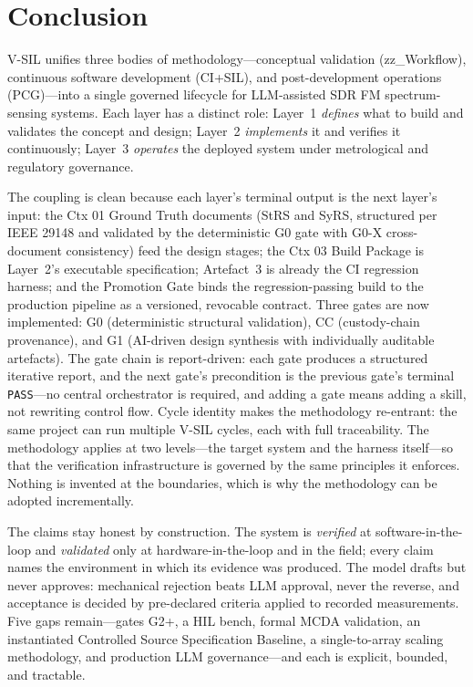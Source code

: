 \documentclass[11pt,a4paper]{article}
\newcommand{\verified}{\emph{verified}}
\newcommand{\validated}{\emph{validated}}
\begin{document}
\section{Conclusion}
\label{sec:conclusion}

V-SIL unifies three bodies of methodology---conceptual validation (zz\_Workflow), continuous
software development (CI+SIL), and post-development operations (PCG)---into a single governed
lifecycle for LLM-assisted SDR FM spectrum-sensing systems. Each layer has a distinct role:
Layer~1 \emph{defines} what to build and validates the concept and design; Layer~2
\emph{implements} it and verifies it continuously; Layer~3 \emph{operates} the deployed system
under metrological and regulatory governance.

The coupling is clean because each layer's terminal output is the next layer's input: the Ctx 01
Ground Truth documents (StRS and SyRS, structured per IEEE 29148 and validated by the
deterministic G0 gate with G0-X cross-document consistency) feed the design stages; the Ctx 03 Build Package is Layer~2's executable specification;
Artefact~3 is already the CI regression harness; and the Promotion Gate binds the
regression-passing build to the production pipeline as a versioned, revocable contract. Three gates are now implemented: G0 (deterministic structural validation), CC (custody-chain
provenance), and G1 (AI-driven design synthesis with individually auditable artefacts). The gate chain is report-driven: each gate produces a structured
iterative report, and the next gate's precondition is the previous gate's terminal
\texttt{PASS}---no central orchestrator is required, and adding a gate means adding a skill,
not rewriting control flow. Cycle identity makes the methodology re-entrant: the same project
can run multiple V-SIL cycles, each with full traceability. The methodology applies at two
levels---the target system and the harness itself---so that the verification infrastructure is
governed by the same principles it enforces. Nothing is invented at the boundaries, which is
why the methodology can be adopted incrementally.

The claims stay honest by construction. The system is \verified{} at software-in-the-loop and
\validated{} only at hardware-in-the-loop and in the field; every claim names the environment in
which its evidence was produced. The model drafts but never approves: mechanical rejection beats
LLM approval, never the reverse, and acceptance is decided by pre-declared criteria applied to
recorded measurements. Five gaps remain---gates G2+, a HIL bench, formal MCDA validation, an instantiated Controlled
Source Specification Baseline, a single-to-array scaling methodology, and production LLM
governance---and each is explicit, bounded, and tractable.
\end{document}
